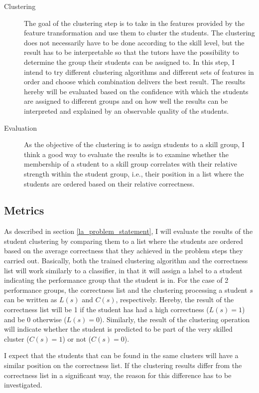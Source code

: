 \begin{description}
	\item[Clustering] The goal of the clustering step is to take in the features provided by the feature transformation and use them to cluster the students. The clustering does not necessarily have to be done according to the skill level, but the result has to be interpretable so that the tutors have the possibility to determine the group their students can be assigned to. In this step, I intend to try different clustering algorithms and different sets of features in order and choose which combination delivers the best result. The results hereby will be evaluated based on the confidence with which the students are assigned to different groups and on how well the results can be interpreted and explained by an observable quality of the students.
	
	\item[Evaluation] As the objective of the clustering is to assign students to a skill group, I think a good way to evaluate the results is to examine whether the membership of a student to a skill group correlates with their relative strength within the student group, i.e., their position in a list where the students are ordered based on their relative correctness. 
\end{description}

\subsection{Metrics}

As described in section \ref{la_problem_statement}, I will evaluate the results of the student clustering by comparing them to a list where the students are ordered based on the average correctness that they achieved in the problem steps they carried out. Basically, both the trained clustering algorithm and the correctness list will work similarly to a classifier, in that it will assign a label to a student indicating the performance group that the student is in. For the case of 2 performance groups, the correctness list and the clustering processing a student $s$ can be written as $L(s)$ and $C(s)$, respectively. Hereby, the result of the correctness list will be 1 if the student has had a high correctness ($L(s) = 1$) and be 0 otherwise ($L(s) = 0$). Similarly, the result of the clustering operation will indicate whether the student is predicted to be part of the very skilled cluster ($C(s) = 1$) or not ($C(s)=0$). 

I expect that the students that can be found in the same clusters will have a similar position on the correctness list. If the clustering results differ from the correctness list in a significant way, the reason for this difference has to be investigated.

